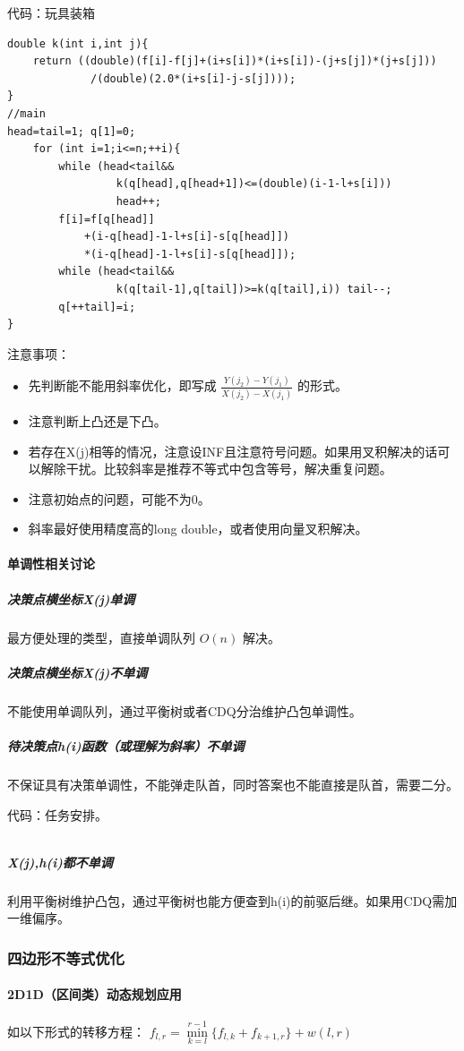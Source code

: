 \documentclass[a4paper,11pt]{article}
\begin{document}
代码：玩具装箱
\begin{verbatim}
double k(int i,int j){
    return ((double)(f[i]-f[j]+(i+s[i])*(i+s[i])-(j+s[j])*(j+s[j]))
             /(double)(2.0*(i+s[i]-j-s[j])));
}
//main
head=tail=1; q[1]=0;
    for (int i=1;i<=n;++i){
        while (head<tail&&
                 k(q[head],q[head+1])<=(double)(i-1-l+s[i])) 
                 head++;
        f[i]=f[q[head]]
            +(i-q[head]-1-l+s[i]-s[q[head]])
            *(i-q[head]-1-l+s[i]-s[q[head]]);
        while (head<tail&&
                 k(q[tail-1],q[tail])>=k(q[tail],i)) tail--;
        q[++tail]=i;
}
\end{verbatim}
注意事项：
\begin{itemize}
\item 先判断能不能用斜率优化，即写成 \(\frac{Y(j_2)-Y(j_1)}{X(j_2)-X(j_1)}\) 的形式。
\item 注意判断上凸还是下凸。
\item 若存在X(j)相等的情况，注意设INF且注意符号问题。如果用叉积解决的话可以解除干扰。比较斜率是推荐不等式中包含等号，解决重复问题。
\item 注意初始点的问题，可能不为0。
\item 斜率最好使用精度高的long double，或者使用向量叉积解决。
\end{itemize}
\paragraph{单调性相关讨论}
\subparagraph{决策点横坐标X(j)单调}
最方便处理的类型，直接单调队列 \(O(n)\) 解决。
\subparagraph{决策点横坐标X(j)不单调}
不能使用单调队列，通过平衡树或者CDQ分治维护凸包单调性。
\subparagraph{待决策点h(i)函数（或理解为斜率）不单调}
不保证具有决策单调性，不能弹走队首，同时答案也不能直接是队首，需要二分。

代码：任务安排。
\inputminted[linenos]{c++}{dp/xielv.cpp}
\subparagraph{X(j),h(i)都不单调}
利用平衡树维护凸包，通过平衡树也能方便查到h(i)的前驱后继。如果用CDQ需加一维偏序。
\subsubsection{四边形不等式优化}
\paragraph{2D1D（区间类）动态规划应用}

如以下形式的转移方程：
\(f_{l,r}=\min\limits_{k=l}^{r-1}\lbrace{f_{l,k}+f_{k+1,r}}\rbrace+w(l,r)\) 
\end{document}
